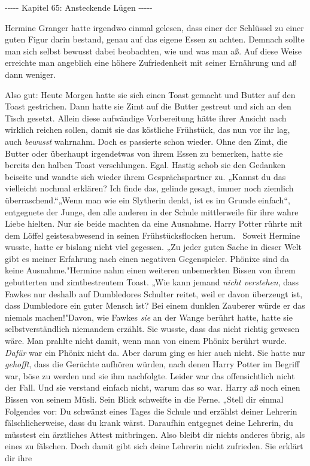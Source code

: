 

\hypertarget{ansteckende-luxfcgen}{%

-\/-\/-\/-\/- Kapitel 65: Ansteckende Lügen -\/-\/-\/-\/-

Hermine Granger hatte irgendwo einmal gelesen, dass einer der Schlüssel zu einer guten Figur darin bestand, genau auf das eigene Essen zu achten. Demnach sollte man sich selbst bewusst dabei beobachten, wie und was man aß. Auf diese Weise erreichte man angeblich eine höhere Zufriedenheit mit seiner Ernährung und aß dann weniger.

Also gut: Heute Morgen hatte sie sich einen Toast gemacht und Butter auf den Toast gestrichen. Dann hatte sie Zimt auf die Butter gestreut und sich an den Tisch gesetzt. Allein diese aufwändige Vorbereitung hätte ihrer Ansicht nach wirklich reichen sollen, damit sie das köstliche Frühstück, das nun vor ihr lag, auch \emph{bewusst} wahrnahm. Doch es passierte schon wieder. Ohne den Zimt, die Butter oder überhaupt irgendetwas von ihrem Essen zu bemerken, hatte sie bereits den halben Toast verschlungen. Egal. Hastig schob sie den Gedanken beiseite und wandte sich wieder ihrem Gesprächspartner zu. „Kannst du das vielleicht nochmal erklären? Ich finde das, gelinde gesagt, immer noch ziemlich überraschend.“„Wenn man wie ein Slytherin denkt, ist es im Grunde einfach“, entgegnete der Junge, den alle anderen in der Schule mittlerweile für ihre wahre Liebe hielten. Nur sie beide machten da eine Ausnahme. Harry Potter rührte mit dem Löffel geistesabwesend in seinen Frühstücksflocken herum. ~Soweit Hermine wusste, hatte er bislang nicht viel gegessen. „Zu jeder guten Sache in dieser Welt gibt es meiner Erfahrung nach einen negativen Gegenspieler. Phönixe sind da keine Ausnahme."Hermine nahm einen weiteren unbemerkten Bissen von ihrem gebutterten und zimtbestreutem Toast. „Wie kann jemand \emph{nicht verstehen}, dass Fawkes nur deshalb auf Dumbledores Schulter reitet, weil er davon überzeugt ist, dass Dumbledore ein guter Mensch ist? Bei einem dunklen Zauberer würde er das niemals machen!"Davon, wie Fawkes \emph{sie} an der Wange berührt hatte, hatte sie selbstverständlich niemandem erzählt. Sie wusste, dass das nicht richtig gewesen wäre. Man prahlte nicht damit, wenn man von einem Phönix berührt wurde. \emph{Dafür} war ein Phönix nicht da. Aber darum ging es hier auch nicht. Sie hatte nur \emph{gehofft}, dass die Gerüchte aufhören würden, nach denen Harry Potter im Begriff war, böse zu werden und sie ihm nachfolgte. Leider war das offensichtlich nicht der Fall. Und sie verstand einfach nicht, warum das so war. Harry aß noch einen Bissen von seinem Müsli. Sein Blick schweifte in die Ferne. „Stell dir einmal Folgendes vor: Du schwänzt eines Tages die Schule und erzählst deiner Lehrerin fälschlicherweise, dass du krank wärst. Daraufhin entgegnet deine Lehrerin, du müsstest ein ärztliches Attest mitbringen. Also bleibt dir nichts anderes übrig, als eines zu fälschen. Doch damit gibt sich deine Lehrerin nicht zufrieden. Sie erklärt dir ihre }
